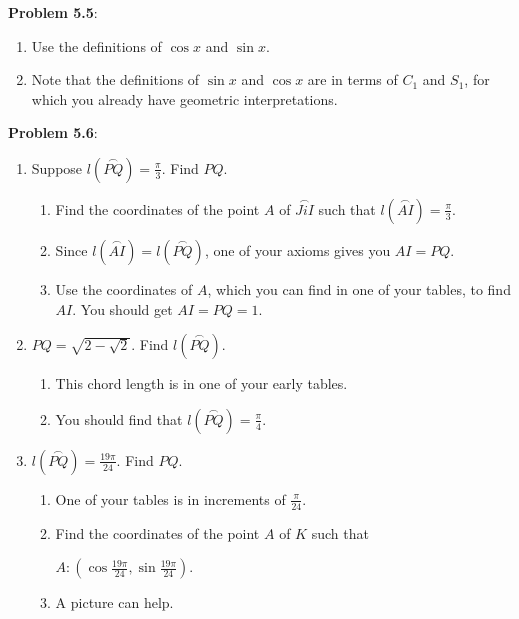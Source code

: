 \documentclass[english]{book}
\newcommand{\arc}[1]{\overset{\frown}{#1} }
\begin{document}
\textbf{Problem 5.5}:
\begin{enumerate}[\hspace{1cm}1)]
  \item Use the definitions of $\cos x$ and $\sin x$. 
  \item Note that the definitions of $\sin x$ and $\cos x$ are in terms of $C_{1}$ and $S_{1}$, for which you already have geometric interpretations.
\end{enumerate}

\textbf{Problem 5.6}:

\begin{enumerate}[\hspace{1cm}a)]
  \item Suppose $l(\arc{PQ})=\frac{\pi}{3}$. Find $PQ$.
    \begin{enumerate}[\hspace{1cm}1)]
      \item Find the coordinates of the point $A$ of $\arc{JiI}$ such that $l(\arc{AI}) = \frac{\pi}{3}$. 
      \item Since $l(\arc{AI})=l(\arc{PQ})$, one of your axioms gives you $AI=PQ$. 
      \item Use the coordinates of $A$, which you can find in one of your tables, to find $AI$. You should get $AI=PQ=1$.
    \end{enumerate}
  \item $PQ=\sqrt{2-\sqrt{2}}$. Find $l(\arc{PQ})$.
    \begin{enumerate}[\hspace{1cm}1)]
      \item This chord length is in one of your early tables.
      \item You should find that $l(\arc{PQ})=\frac{\pi}{4}$.
    \end{enumerate}
  \item $l(\arc{PQ}) = \frac{19\pi}{24}$. Find $PQ$.
    \begin{enumerate}[\hspace{1cm}1)]
      \item One of your tables is in increments of $\frac{\pi}{24}$. 
      \item Find the coordinates of the point $A$ of $K$ such that 

          $A:(\cos \frac{19\pi}{24}, \sin \frac{19\pi}{24})$.
      \item A picture can help.
     \end{enumerate}
\end{enumerate}
\end{document}
